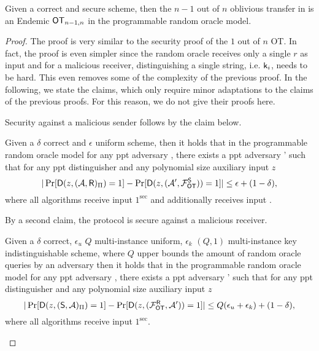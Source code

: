 \begin{lemma}\label{lem:allbutone}
Given a correct and secure \UKA scheme, then the $n-1$ out of $n$ oblivious transfer in   is an Endemic $\mathsf{OT}_{n-1,n}$ in the programmable random oracle model. 
\end{lemma}

\begin{proof}
The proof is very similar to the security proof of the $1$ out of $n$ OT. In fact, the proof is even simpler since the random oracle receives only a single $r$ as input and for a malicious receiver, distinguishing a single string, i.e. $\mathsf{k}_{i}$, needs to be hard. This even removes some of the complexity of the previous proof. In the following, we state the claims, which only require minor adaptations to the claims of the previous proofs. For this reason, we do not give their proofs here. 

Security against a malicious sender follows by the claim below. 
\begin{claim}\label{claim:malsender}
Given a $\delta$ correct and $\epsilon$ uniform \UKA scheme, then it holds that in the programmable random oracle model for any ppt adversary \Adv, there exists a ppt adversary \Adv' such that for any ppt distinguisher \D and any polynomial size auxiliary input $z$
$$
|\Pr[\mathsf D(z,(\mathcal{A},\mathsf{R})_{\Pi})=1] -\Pr[\mathsf D(z, (\mathcal{A}', \mathcal{F}_{\mathsf{OT}}^\mathsf{S}))=1]|\leq \epsilon+(1-\delta),
$$
where all algorithms receive input $1^\sec$ and \rec additionally receives input \set.
\end{claim}


By a second claim, the protocol is secure against a malicious receiver.
\begin{claim}\label{claim:malreceiver}
Given a $\delta$ correct, $\epsilon_u$ $Q$ multi-instance uniform, $\epsilon_k$ $(Q,1)$ multi-instance key indistinguishable  \UKA scheme, where $Q$ upper bounds the amount of random oracle queries by an adversary then it holds that in the programmable random oracle model for any ppt adversary \Adv, there exists a ppt adversary \Adv' such that for any ppt distinguisher \D and any polynomial size auxiliary input $z$
$$
|\Pr[\mathsf D(z,(\mathsf{S}, \mathcal{A})_{\Pi})=1] -\Pr[\mathsf D(z,(\mathcal{F}_{\mathsf{OT}}^\mathsf{R},\mathcal{A}'))=1]|\leq Q(\epsilon_{u}+\epsilon_{k})+(1-\delta),
$$
where all algorithms receive input $1^\sec$.
\end{claim}
\pe
\end{proof}

